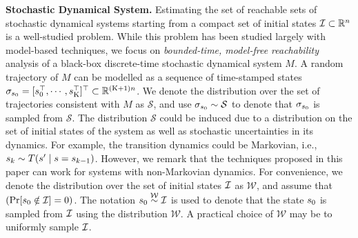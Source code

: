 \noindent \textbf{Stochastic Dynamical System.} Estimating the set of reachable sets of
stochastic dynamical systems starting from a compact set of initial states $\mathcal{I} \subset \mathbb{R}^n$
is a well-studied problem. While this problem has been studied largely with model-based techniques,
we focus on {\em bounded-time, model-free reachability} analysis of a black-box discrete-time
stochastic dynamical system $M$. A random trajectory of $M$ can be modelled as a sequence of 
time-stamped states $\sigma_{s_0} = [s_0^\top, \cdots, s^\top_{\mathrm{K}}]^\top \subset 
\mathbb{R}^{(\mathrm{K}+1)n}$. We denote the distribution over the set of trajectories consistent
with $M$ as $\mathcal{S}$, and use $\sigma_{s_0} \sim \mathcal{S}$ to denote that $\sigma_{s_0}$
is sampled from $\mathcal{S}$. The distribution $\mathcal{S}$ could be induced due to a distribution
on the set of initial states of the system as well as stochastic uncertainties in its dynamics. 
For example, the transition dynamics could be Markovian, i.e.,
$s_{k} \sim T(s' \mid s = s_{k-1})$. However, we remark
that the techniques proposed in this paper can work for systems with non-Markovian dynamics.
For convenience, we denote the distribution over the set of initial states $\mathcal{I}$ as $\mathcal{W}$, and
assume that $(\Pr[s_0 \notin \mathcal{I}]=0)$. The notation $s_0 \stackrel{\mathcal{W}}{\sim} \mathcal{I}$
is used to denote that the state $s_0$ is sampled from $\mathcal{I}$ using the distribution $\mathcal{W}$.
A practical choice of $\mathcal{W}$ may be to uniformly sample $\mathcal{I}$.  

